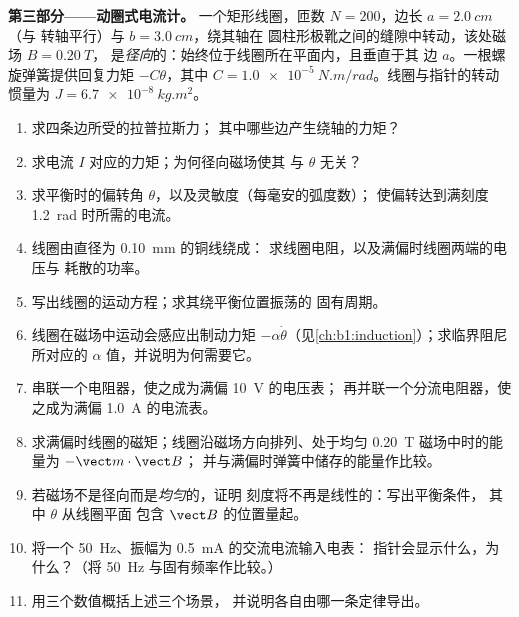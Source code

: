 \begin{problem}
\medskip
\noindent\textbf{第三部分——动圈式电流计。}
一个矩形线圈，匝数 $N = 200$，边长 $a = \qty{2.0}{cm}$（与
转轴平行）与 $b = \qty{3.0}{cm}$，绕其轴在
圆柱形极靴之间的缝隙中转动，该处磁场 $B = \qty{0.20}{T}$，
是\emph{径向}的：始终位于线圈所在平面内，且垂直于其
边 $a$。一根螺旋弹簧提供回复力矩 $-C\theta$，其中
$C = \qty{1.0e-5}{N.m/rad}$。线圈与指针的转动惯量为
$J = \qty{6.7e-8}{kg.m^2}$。
\begin{enumerate}[resume]
  \item 求四条边所受的拉普拉斯力；
        其中哪些边产生绕轴的力矩？
  \item 求电流 $I$ 对应的力矩；为何径向磁场使其
        与 $\theta$ 无关？
  \item 求平衡时的偏转角 $\theta$，以及灵敏度（每毫安的弧度数）；
        使偏转达到满刻度 \qty{1.2}{rad} 时所需的电流。
  \item 线圈由直径为 \qty{0.10}{mm} 的铜线绕成：
        求线圈电阻，以及满偏时线圈两端的电压与
        耗散的功率。
  \item 写出线圈的运动方程；求其绕平衡位置振荡的
        固有周期。
  \item 线圈在磁场中运动会感应出制动力矩
        $-\alpha\dot\theta$（见\cref{ch:b1:induction}）；求临界阻尼所对应的
        $\alpha$ 值，并说明为何需要它。
  \item 串联一个电阻器，使之成为满偏 \qty{10}{V} 的电压表；
        再并联一个分流电阻器，使之成为满偏 \qty{1.0}{A} 的电流表。
  \item 求满偏时线圈的磁矩；线圈沿磁场方向排列、处于均匀 \qty{0.20}{T} 磁场中时的能量为 $-\vect m\cdot
        \vect B$；
        并与满偏时弹簧中储存的能量作比较。
  \item 若磁场不是径向而是\emph{均匀}的，证明
        刻度将不再是线性的：写出平衡条件，
        其中 $\theta$ 从线圈平面
        包含 $\vect B$ 的位置量起。
  \item 将一个 \qty{50}{Hz}、振幅为 \qty{0.5}{mA} 的交流电流输入电表：
        指针会显示什么，为什么？（将 \qty{50}{Hz}
        与固有频率作比较。）
  \item 用三个数值概括上述三个场景，
        并说明各自由哪一条定律导出。
\end{enumerate}
\end{problem}
